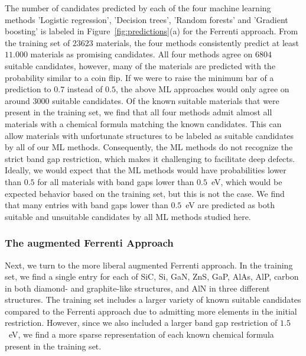 \documentclass[superscriptaddress,unsortedaddress,
 amsmath,amssymb,
 aps,
]{revtex4-2}
\begin{document}


The number of candidates predicted by each of the four machine learning methods 'Logistic regression', 'Decision trees', 'Random forests' and 'Gradient boosting' is labeled in Figure~\ref{fig:predictions}(a) for the Ferrenti approach. 
From the training set of $23623$ materials, the four methods consistently predict at least $11.000$ materials as promising candidates. All four methods agree on $6804$ suitable candidates, however, many of the materials are predicted with the probability similar to a coin flip. 
If we were to raise the minimum bar of a prediction to
$0.7$ instead of $0.5$, the above ML approaches would only agree on around $3000$ suitable candidates. 
Of the known suitable materials that were present in the training set, we find that all four methods admit almost all materials with a chemical formula matching the known candidates. This can allow materials with unfortunate structures to be labeled as suitable candidates by all of our ML methods. Consequently, the ML methods do not recognize the strict band gap restriction, which makes it challenging to facilitate deep defects. Ideally, we would expect that the ML methods would have probabilities lower than $0.5$ for all materials with band gaps lower than $0.5$~eV, which would be expected behavior based on the training set, but this is not the case. We find that many entries with band gaps lower than $0.5$~eV are predicted as both suitable and unsuitable candidates by all ML methods studied here. 

\subsubsection*{The augmented Ferrenti Approach}

Next, we turn to the more liberal augmented Ferrenti approach. In the training set, we find a single entry for each of SiC, Si, GaN, ZnS, GaP, AlAs, AlP, carbon in both diamond- and graphite-like structures, and AlN in three different structures. The training set includes a larger variety of known suitable candidates compared to the Ferrenti approach due to admitting more elements in the initial restriction. However, since we also included a larger band gap restriction of $1.5$~eV, we find a more sparse representation of each known chemical formula present in the training set.
\end{document}
